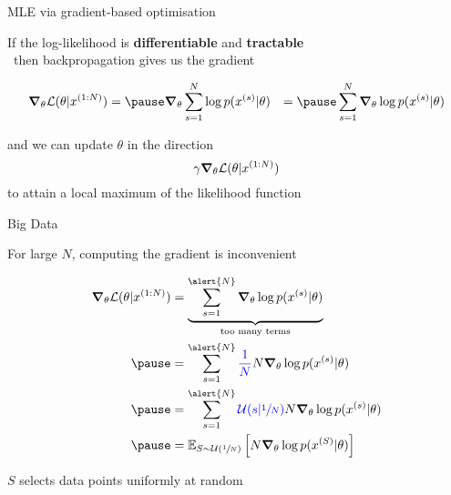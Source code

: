 \documentclass[14pt]{beamer}
\begin{document}
\begin{frame}{MLE via gradient-based optimisation}

If the log-likelihood is {\bf differentiable} and  {\bf tractable}\\
~then backpropagation gives us the gradient
\begin{small}
\begin{equation*}
\begin{aligned}
\grad_\theta \mathcal L(\theta|x^{(1:N)}) &= \pause \grad_\theta \sum_{s=1}^N \log p(x^{(s)}|\theta) 
 &= \pause \sum_{s=1}^N \grad_\theta \log p(x^{(s)}|\theta)
\end{aligned}
\end{equation*}
\end{small}  \pause

and we can update $\theta$ in the direction
\begin{equation*}
\gamma \grad_\theta \mathcal L(\theta|x^{(1:N)})
\end{equation*}
to attain a local maximum of the likelihood function

\end{frame}


\begin{frame}{Big Data}

For large \alert{$N$}, computing the gradient is inconvenient
\begin{small}
\begin{equation*}
\begin{aligned}
\grad_\theta \mathcal L(\theta|x^{(1:N)}) &=   \underbrace{\sum_{s=1}^{\alert{N}} \grad_\theta \log p(x^{(s)}|\theta)}_{\text{too many terms}} \\ \pause
&=   \sum_{s=1}^{\alert{N}} \textcolor{blue}{\frac{1}{ N} } N \grad_\theta \log p(x^{(s)}|\theta) \\ \pause
&= \sum_{s=1}^{\alert{N}}\textcolor{blue}{\mathcal U(s|\sfrac{1}{N})}  N \grad_\theta \log p(x^{(s)}|\theta) \\ \pause
&= \mathbb E_{S\sim \mathcal U(\sfrac{1}{N})}\left[ N \grad_\theta  \log p(x^{(S)}|\theta)\right]
\end{aligned}
\end{equation*} 
\end{small}

$S$ selects data points uniformly at random



\end{frame}
\end{document}
